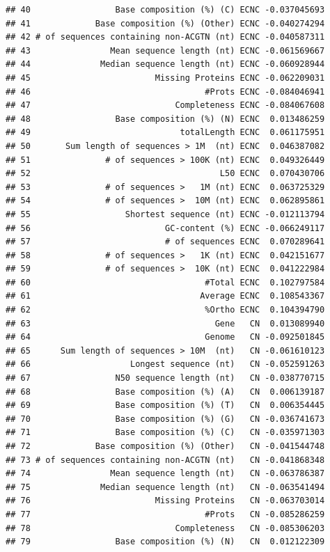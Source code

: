\documentclass[10pt,letterpaper]{article}
\begin{document}
\begin{verbatim}
## 40                 Base composition (%) (C) ECNC -0.037045693
## 41             Base composition (%) (Other) ECNC -0.040274294
## 42 # of sequences containing non-ACGTN (nt) ECNC -0.040587311
## 43                Mean sequence length (nt) ECNC -0.061569667
## 44              Median sequence length (nt) ECNC -0.060928944
## 45                         Missing Proteins ECNC -0.062209031
## 46                                   #Prots ECNC -0.084046941
## 47                             Completeness ECNC -0.084067608
## 48                 Base composition (%) (N) ECNC  0.013486259
## 49                              totalLength ECNC  0.061175951
## 50       Sum length of sequences > 1M  (nt) ECNC  0.046387082
## 51               # of sequences > 100K (nt) ECNC  0.049326449
## 52                                      L50 ECNC  0.070430706
## 53               # of sequences >   1M (nt) ECNC  0.063725329
## 54               # of sequences >  10M (nt) ECNC  0.062895861
## 55                   Shortest sequence (nt) ECNC -0.012113794
## 56                           GC-content (%) ECNC -0.066249117
## 57                           # of sequences ECNC  0.070289641
## 58               # of sequences >   1K (nt) ECNC  0.042151677
## 59               # of sequences >  10K (nt) ECNC  0.041222984
## 60                                   #Total ECNC  0.102797584
## 61                                  Average ECNC  0.108543367
## 62                                   %Ortho ECNC  0.104394790
## 63                                     Gene   CN  0.013089940
## 64                                   Genome   CN -0.092501845
## 65      Sum length of sequences > 10M  (nt)   CN -0.061610123
## 66                    Longest sequence (nt)   CN -0.052591263
## 67                 N50 sequence length (nt)   CN -0.038770715
## 68                 Base composition (%) (A)   CN  0.006139187
## 69                 Base composition (%) (T)   CN  0.006354445
## 70                 Base composition (%) (G)   CN -0.036741673
## 71                 Base composition (%) (C)   CN -0.035971303
## 72             Base composition (%) (Other)   CN -0.041544748
## 73 # of sequences containing non-ACGTN (nt)   CN -0.041868348
## 74                Mean sequence length (nt)   CN -0.063786387
## 75              Median sequence length (nt)   CN -0.063541494
## 76                         Missing Proteins   CN -0.063703014
## 77                                   #Prots   CN -0.085286259
## 78                             Completeness   CN -0.085306203
## 79                 Base composition (%) (N)   CN  0.012122309

\end{verbatim}
\end{document}

